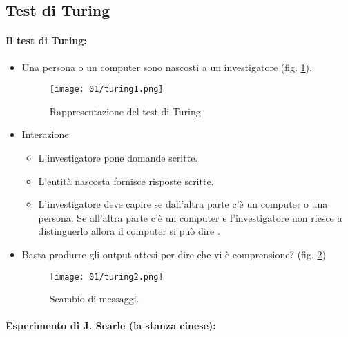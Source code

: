 \subsection{Test di Turing}

\paragraph{Il test di Turing:}

\begin{itemize}
  \item Una persona o un computer sono nascosti a un investigatore (fig. \ref{fig:Turing}).
  \begin{figure}[h]
    \centering
    \texttt{[image: 01/turing1.png]}
    \caption{Rappresentazione del test di Turing.}
    \label{fig:Turing}
  \end{figure}
   \item Interazione:
     \begin{itemize}
      \item L'investigatore pone domande scritte. 
      \item L'entità nascosta fornisce risposte scritte. 
      \item L'investigatore deve capire se dall'altra parte c'è un computer o una persona. Se all'altra parte c'è un computer e l'investigatore non riesce a distinguerlo allora il computer si può dire .
     \end{itemize}
   \item Basta produrre gli output attesi per dire che vi è comprensione? (fig. \ref{fig:Turing2})
  \begin{figure}[h]
    \centering
    \texttt{[image: 01/turing2.png]}
    \caption{Scambio di messaggi.}
    \label{fig:Turing2}
  \end{figure}
\end{itemize}

\paragraph{Esperimento di J. Searle (la stanza cinese):}

